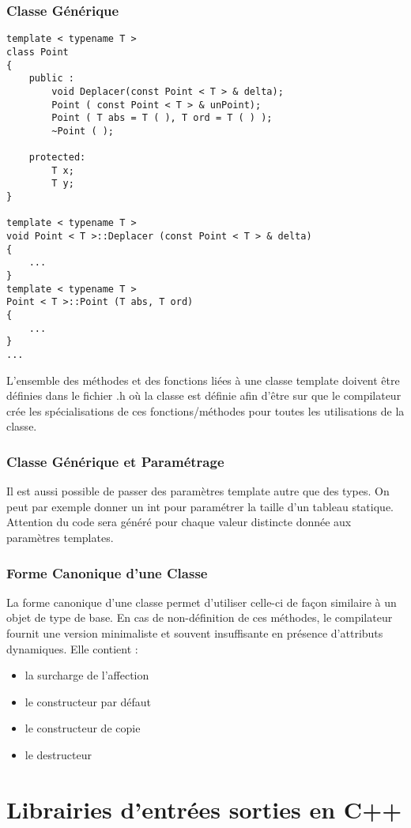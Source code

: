 \documentclass[10pt,a4paper,twoside]{article}
\begin{document}
\subsubsection{Classe Générique}
\begin{verbatim}
template < typename T >
class Point
{
	public :
		void Deplacer(const Point < T > & delta);
		Point ( const Point < T > & unPoint);
		Point ( T abs = T ( ), T ord = T ( ) );
		~Point ( );
		
	protected:
		T x;
		T y;
}

template < typename T >
void Point < T >::Deplacer (const Point < T > & delta)
{
	...
}
template < typename T >
Point < T >::Point (T abs, T ord)
{
	...
}
...
\end{verbatim}

L'ensemble des méthodes et des fonctions liées à une classe template doivent être définies dans le fichier .h où la classe est définie afin d'être sur que le compilateur crée les spécialisations de ces fonctions/méthodes pour toutes les utilisations de la classe.

\subsubsection{Classe Générique et Paramétrage}
Il est aussi possible de passer des paramètres template autre que des types. On peut par exemple donner un int pour paramétrer la taille d'un tableau statique. Attention du code sera généré pour chaque valeur distincte donnée aux paramètres templates.

\subsubsection{Forme Canonique d'une Classe}
La forme canonique d'une classe permet d'utiliser celle-ci de façon similaire à un objet de type de base. En cas de non-définition de ces méthodes, le compilateur fournit une version minimaliste et souvent insuffisante en présence d'attributs dynamiques. Elle contient :
\begin{itemize}
\item la surcharge de l'affection
\item le constructeur par défaut
\item le constructeur de copie
\item le destructeur
\end{itemize}


\section{Librairies d'entrées sorties en C++}
\end{document}

